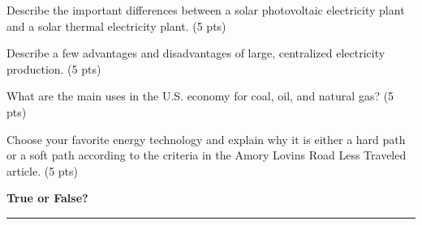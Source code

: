 \documentclass[12pt, oneside]{article}
\newif\ifsolution
\newcommand{\chead}[1]
{\begin{center}\large\textbf{#1}\end{center}
\hrule
\vspace{10pt}}
\newcommand{\solution}[1]
{\ifsolution
Answer: {\it #1}
\else\fi}
\begin{document}
\solution{Differences: The main difference is in the source of heat.  A
coal plant uses combustion of coal while a nuclear plant uses a chain
reaction of nuclear fission to create heat.

Similarities: The main
similarity is in the use of steam turbines to generate electricity
through a steam heat engine.}

\vfill

Describe the important differences between a solar photovoltaic
electricity plant and a solar thermal electricity plant. (5 pts)

\solution{Solar PV electricity creates direct current electricity
without a  thermal cycle while solar thermal electricity uses technology
Rankine cycle steam turbines to generate AC electricity.}

\vfill

Describe a few advantages and disadvantages of large, centralized
electricity production. (5 pts)

\solution{Advantages include economies of scale that make larger plants
more cost effective.  Disadvantages include large investments, large
effect from individual plant failures, and
transmission costs.}

\vfill

\newpage

What are the main uses in the U.S. economy for coal, oil, and natural gas? (5 pts)

\solution{Coal is mostly used for electricity production, oil is mostly
used for transportation, natural gas has many uses including
electricity, heating, and transportation.}

\vfill

Choose your favorite energy technology and explain why it is either a hard
path or a soft path according to the criteria in the Amory Lovins Road
Less Traveled article. (5 pts)

%
%
\vfill


\newpage
\chead{True or False?}
\end{document}
